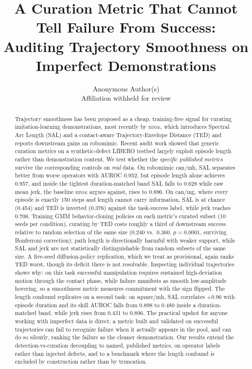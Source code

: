 \documentclass[10pt]{article}
\title{A Curation Metric That Cannot Tell Failure From Success:\\
Auditing Trajectory Smoothness on Imperfect Demonstrations}
\author{Anonymous Author(s)\\ \small Affiliation withheld for review}
\date{}
\newcommand{\rinse}{\textsc{rinse}}
\begin{document}
\maketitle

\begin{abstract}
Trajectory smoothness has been proposed as a cheap, training-free signal for
curating imitation-learning demonstrations, most recently by \rinse{}, which
introduces Spectral Arc Length (SAL) and a contact-aware Trajectory-Envelope
Distance (TED) and reports downstream gains on robomimic. Recent audit work
showed that generic curation metrics on a synthetic-defect LIBERO testbed
largely exploit episode length rather than demonstration content. We test
whether the \emph{specific published metrics} survive the corresponding
controls on \emph{real} data. On robomimic can/mh, SAL separates
better from worse operators with AUROC 0.952, but episode length alone
achieves 0.957, and inside the tightest duration-matched band SAL falls to
0.628 while raw mean jerk, the baseline \rinse{} argues
against, rises to 0.896. On can/mg, where every episode is exactly 150
steps and length cannot carry information, SAL is at chance (0.454) and TED
is inverted (0.376) against the task-success label, while jerk reaches
0.706. Training GMM behavior-cloning policies on each metric's curated
subset (10 seeds per condition), curating by TED costs roughly a third of
downstream success relative to random selection of the same size (0.240
vs.\ 0.360, $p{=}0.0001$, surviving Bonferroni correction); path length is
directionally harmful with weaker support, while SAL and jerk are not
statistically distinguishable from random subsets of the same size. A five-seed diffusion-policy replication, which we treat as provisional, again ranks TED worst, though its deficit there is not resolvable.
Inspecting individual trajectories shows why: on this task successful
manipulation requires sustained high-deviation motion through the contact
phase, while failure manifests as smooth low-amplitude hovering, so a
smoothness metric measures commitment with the sign flipped. The length
confound replicates on a second task: on square/mh, SAL correlates $+0.96$
with episode duration and its skill AUROC falls from 0.898 to 0.480 inside a
duration-matched band, while jerk rises from 0.431 to 0.896. The practical
upshot for anyone working with imperfect data is direct: a metric built and
validated on successful trajectories can fail to recognize failure when it
actually appears in the pool, and can do so silently, ranking the failure as
the cleaner demonstration. Our results extend the detection-vs-curation
decoupling to named, published metrics, on operator labels rather than
injected defects, and to a benchmark where the length confound is excluded
by construction rather than by truncation.
\end{abstract}
\end{document}
